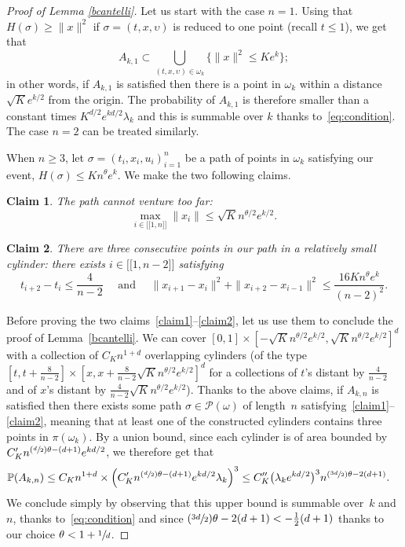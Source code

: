 \documentclass[10pt]{amsart}
\let\mathcal\mathscr
\newcommand{\Psfrac}[2]{(\sfrac{#1}{#2})}
\newcommand{\lint}{\mathopen{[\![}}
\newcommand{\rint}{\mathclose{]\!]}}
\newtheorem{claim}{Claim}
\theoremstyle{definition}
\newcommand{\cP}{{\ensuremath{\mathcal P}} }
\newcommand{\bbP}{{\ensuremath{\mathbb P}} }
\let\gl\lambda
\let\ups\upsilon
\let\go\omega
\begin{document}
\begin{proof}[Proof of Lemma \ref{bcantelli}]
Let us start with the case $n=1$.
Using that $H(\sigma) \geq \|x\|^2$ if $\sigma =(t,x,\ups)$ is reduced to one point (recall $t\leq 1$), we get that
\[
A_{k,1} \subset \bigcup_{(t,x,\ups) \in \go_k} \{ \|x\|^2 \leq Ke^{k} \};
\]
in other words, if $A_{k,1}$ is satisfied then there
is a point in $\go_k$ within a distance $\sqrt{K} e^{k/2}$ from the origin.
The probability
of $A_{k,1}$ is therefore smaller than a constant times $ K^{d/2} e^{ kd /2} \gl_k$ and this is summable over $k$ thanks to~\eqref{eq:condition}. The case $n=2$ can be treated similarly.

When $n\ge 3$, let $\sigma = (t_i,x_i,u_i)_{i=1}^n$ be a path of points in
$\go_k$ satisfying our event, \ie $H(\sigma) \leq K n^{\theta} e^{k}$.
We make the two following claims.

\setcounter{claim}{0}
\begin{claim}
The path cannot venture too far:
\begin{equation}\label{claim1}
\max_{i\in \lint 1, n\rint} \|x_i\| \le \sqrt{K} n^{\theta/2} e^{k/2}.
\end{equation}
\end{claim}

\begin{claim}
There are three consecutive points in our path in a relatively small cylinder:
there exists $i \in \lint 1,n-2\rint$ satisfying
\begin{equation}\label{claim2}
t_{i+2}-t_i\le \frac{4}{n-2} \quad \text{ and } \quad
\|x_{i+1}-x_i \|^2+\|x_{i+2}-x_{i-1} \|^2
\le
\frac{16 K n^{\theta}e^{k}}{(n-2)^2}.
\end{equation}
\end{claim}

Before proving the two claims~\eqref{claim1}--\eqref{claim2},
let us use them to conclude the proof of Lemma~\ref{bcantelli}.
We can cover
$[0,1] \times [ - \sqrt{K} n^{\theta/2} e^{k/2}, \sqrt{K} n^{\theta/2} e^{k/2} ]^d$
with a collection of
$C_{K} n^{1+d}$ overlapping cylinders
(of the type $[t,t+\frac{8}{n-2}] \times [x,x+ \frac{8 }{n-2}\sqrt{K} n^{\theta/2} e^{k/2} ]^{d}$ for a collections of $t$'s distant by $\frac{4}{n-2}$ and of $x$'s distant by $\frac{4 }{n-2}\sqrt{K} n^{\theta/2} e^{k/2}$).
Thanks to the above claims,
if $A_{k,n}$ is satisfied
then there exists some path $\sigma \in \cP(\go)$
of length~$n$
satisfying~\eqref{claim1}--\eqref{claim2}, meaning that
at least one of the constructed cylinders contains
three points in $\pi(\go_k)$.
By a union bound, since
each cylinder is of area bounded by $C'_{K} n^{\Psfrac{d}{2} \theta -(d+1)} e^{kd/2}$, we therefore get that
\begin{align*}
\bbP(A_{k,n}) &\leq C_{K} n^{1+d} \times \Bigl(C'_{K} n^{\Psfrac{d}{2} \theta - (d+1) } e^{kd/2} \lambda_k\Bigr)^3
\leq C''_{K} \bigl(\gl_k e^{kd/2} \bigr)^3 n^{\Psfrac{3d}{2}\theta-2(d+1)}.
\end{align*}
We conclude simply by observing that this upper bound is summable over~$k$ and~$n$, thanks to~\eqref{eq:condition}
and since $\Psfrac{3d}{2}\theta-2(d+1) < -\frac12 (d+1)$ thanks to our choice $\theta<1+\sfrac{1}{d}$.


\end{proof}
\end{document}
